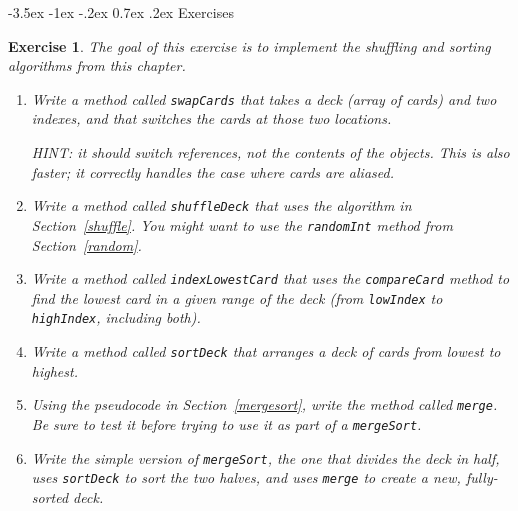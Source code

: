 \documentclass[12pt]{book}
\makeatletter
\theoremstyle{exercise}
\newtheorem{exercise}{Exercise}[chapter]
\newcommand{\java}[1]{\verb"#1"}
\renewcommand{\section}{\@startsection {section}{1}{\z@}%
    {-3.5ex \@plus -1ex \@minus -.2ex}%
    {0.7ex \@plus.2ex}%
    {\normalfont\Large\bfseries}}
\newcommand{\java}[1]{\lstinline{#1}} %
\makeatother
\begin{document}
\section{Exercises}


\begin{exercise}
The goal of this exercise is to implement the shuffling and sorting algorithms from this chapter.

\begin{enumerate}



\item Write a method called \java{swapCards} that takes a deck (array of cards) and two indexes, and that switches the cards at those two locations.

HINT: it should switch references, not the contents of the objects.
This is also faster; it correctly handles the case where cards are aliased.

\item Write a method called \java{shuffleDeck} that uses the algorithm in Section~\ref{shuffle}.
You might want to use the \java{randomInt} method from Section~\ref{random}.

\item Write a method called \java{indexLowestCard} that uses the \java{compareCard} method to find the lowest card in a given range of the deck (from \java{lowIndex} to \java{highIndex}, including both).

\item Write a method called \java{sortDeck} that arranges a deck of cards from lowest to highest.

\item Using the pseudocode in Section~\ref{mergesort}, write the method called \java{merge}.
Be sure to test it before trying to use it as part of a \java{mergeSort}.

\item Write the simple version of \java{mergeSort}, the one that divides the deck in half, uses \java{sortDeck} to sort the two halves, and uses \java{merge} to create a new, fully-sorted deck.


\end{enumerate}
\end{exercise}
\end{document}
